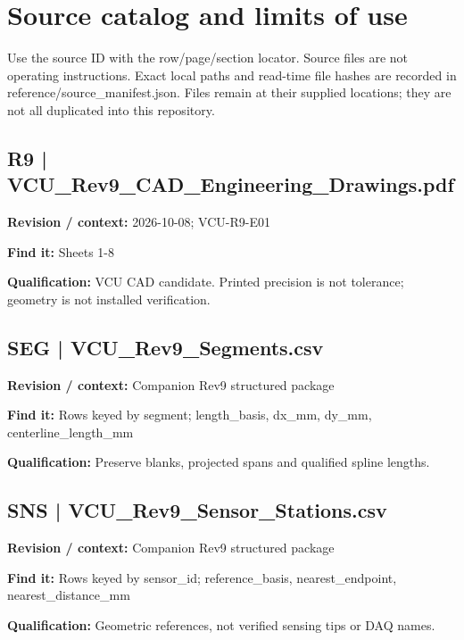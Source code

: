 \documentclass[11pt]{article}
\begin{document}
\clearpage\section{Source catalog and limits of use}
Use the source ID with the row/page/section locator. Source files are not operating instructions. Exact local paths and read-time file hashes are recorded in reference/source\_manifest.json. Files remain at their supplied locations; they are not all duplicated into this repository.
\begin{minipage}{\textwidth}\small
\subsection*{R9 | VCU\_\allowbreak{}Rev9\_\allowbreak{}CAD\_\allowbreak{}Engineering\_\allowbreak{}Drawings.pdf}
\textbf{Revision / context:} 2026-10-08; VCU-R9-E01\par
\textbf{Find it:} Sheets 1-8\par
\textbf{Qualification:} VCU CAD candidate. Printed precision is not tolerance; geometry is not installed verification.\par
\end{minipage}\par\vspace{5pt}
\begin{minipage}{\textwidth}\small
\subsection*{SEG | VCU\_\allowbreak{}Rev9\_\allowbreak{}Segments.csv}
\textbf{Revision / context:} Companion Rev9 structured package\par
\textbf{Find it:} Rows keyed by segment; length\_\allowbreak{}basis, dx\_\allowbreak{}mm, dy\_\allowbreak{}mm, centerline\_\allowbreak{}length\_\allowbreak{}mm\par
\textbf{Qualification:} Preserve blanks, projected spans and qualified spline lengths.\par
\end{minipage}\par\vspace{5pt}
\begin{minipage}{\textwidth}\small
\subsection*{SNS | VCU\_\allowbreak{}Rev9\_\allowbreak{}Sensor\_\allowbreak{}Stations.csv}
\textbf{Revision / context:} Companion Rev9 structured package\par
\textbf{Find it:} Rows keyed by sensor\_\allowbreak{}id; reference\_\allowbreak{}basis, nearest\_\allowbreak{}endpoint, nearest\_\allowbreak{}distance\_\allowbreak{}mm\par
\textbf{Qualification:} Geometric references, not verified sensing tips or DAQ names.\par
\end{minipage}\par\vspace{5pt}
\end{document}
